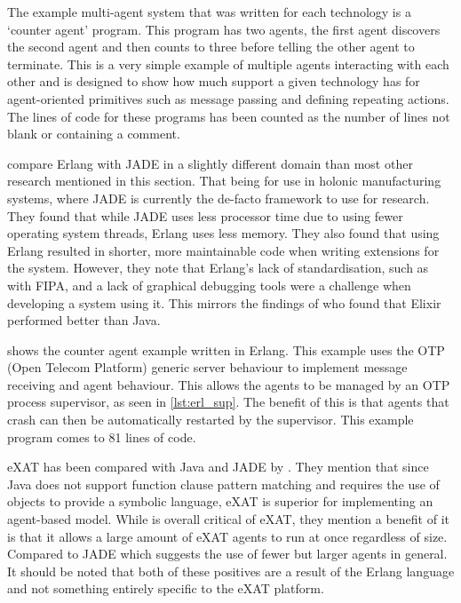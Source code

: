 The example multi-agent system that was written for each technology is a `counter agent' program.
This program has two agents, the first agent discovers the second agent and then counts to three before telling the other agent to terminate.
This is a very simple example of multiple agents interacting with each other and is designed to show how much support a given technology has for agent-oriented primitives such as message passing and defining repeating actions.
The lines of code for these programs has been counted as the number of lines not blank or containing a comment.

 compare Erlang with JADE in a slightly different domain than most other research mentioned in this section.
That being for use in holonic manufacturing systems, where JADE is currently the de-facto framework to use for research.
They found that while JADE uses less processor time due to using fewer operating system threads, Erlang uses less memory.
They also found that using Erlang resulted in shorter, more maintainable code when writing extensions for the system.
However, they note that Erlang's lack of standardisation, such as with FIPA, and a lack of graphical debugging tools were a challenge when developing a system using it.
This mirrors the findings of  who found that Elixir performed better than Java.

 shows the counter agent example written in Erlang.
This example uses the OTP (Open Telecom Platform) generic server behaviour to implement message receiving and agent behaviour.
This allows the agents to be managed by an OTP process supervisor, as seen in \cref{lst:erl_sup}.
The benefit of this is that agents that crash can then be automatically restarted by the supervisor.
This example program comes to 81 lines of code.

eXAT has been compared with Java and JADE by .
They mention that since Java does not support function clause pattern matching and requires the use of objects to provide a symbolic language, eXAT is superior for implementing an agent-based model.
While  is overall critical of eXAT, they mention a benefit of it is that it allows a large amount of eXAT agents to run at once regardless of size.
Compared to JADE which suggests the use of fewer but larger agents in general.
It should be noted that both of these positives are a result of the Erlang language and not something entirely specific to the eXAT platform.

